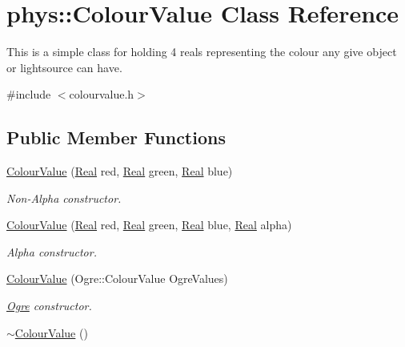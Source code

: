 \hypertarget{classphys_1_1ColourValue}{
\section{phys::ColourValue Class Reference}
\label{d3/db0/classphys_1_1ColourValue}
}


This is a simple class for holding 4 reals representing the colour any give object or lightsource can have.  




{\ttfamily \#include $<$colourvalue.h$>$}

\subsection*{Public Member Functions}
\begin{DoxyCompactItemize}
\item 
\hyperlink{classphys_1_1ColourValue_ac63b5fbf1b35b1855330ed5737fc16e0}{ColourValue} (\hyperlink{namespacephys_af7eb897198d265b8e868f45240230d5f}{Real} red, \hyperlink{namespacephys_af7eb897198d265b8e868f45240230d5f}{Real} green, \hyperlink{namespacephys_af7eb897198d265b8e868f45240230d5f}{Real} blue)
\begin{DoxyCompactList}\small\item\em Non-\/Alpha constructor. \item\end{DoxyCompactList}\item 
\hyperlink{classphys_1_1ColourValue_a28ee2493cd6a7bb8bc4104d223e3e709}{ColourValue} (\hyperlink{namespacephys_af7eb897198d265b8e868f45240230d5f}{Real} red, \hyperlink{namespacephys_af7eb897198d265b8e868f45240230d5f}{Real} green, \hyperlink{namespacephys_af7eb897198d265b8e868f45240230d5f}{Real} blue, \hyperlink{namespacephys_af7eb897198d265b8e868f45240230d5f}{Real} alpha)
\begin{DoxyCompactList}\small\item\em Alpha constructor. \item\end{DoxyCompactList}\item 
\hyperlink{classphys_1_1ColourValue_a8a004962cde5fd3063dd845be4256fa9}{ColourValue} (Ogre::ColourValue OgreValues)
\begin{DoxyCompactList}\small\item\em \hyperlink{namespaceOgre}{Ogre} constructor. \item\end{DoxyCompactList}\item 
\hypertarget{classphys_1_1ColourValue_adc37cfdba61d80ad23765cea5c858751}{
\hyperlink{classphys_1_1ColourValue_adc37cfdba61d80ad23765cea5c858751}{$\sim$ColourValue} ()}
\label{d3/db0/classphys_1_1ColourValue_adc37cfdba61d80ad23765cea5c858751}


\end{DoxyCompactItemize}
